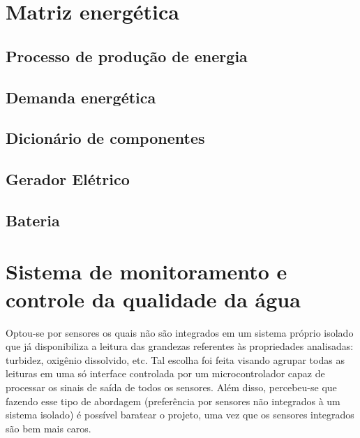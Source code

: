     
  \section{Matriz energética}
  	\subsection{Processo de produção de energia}
  		
  	\subsection{Demanda energética}
  		
  	\subsection{Dicionário de componentes}
  		
  	\subsection{Gerador Elétrico}
  		
  	\subsection{Bateria}
  		
    
  \section{Sistema de monitoramento e controle da qualidade da água}
    
    
      Optou-se por sensores os quais não são integrados em um sistema próprio isolado que já disponibiliza a leitura das grandezas
      referentes às propriedades analisadas: turbidez, oxigênio dissolvido, etc. Tal escolha foi feita visando agrupar todas as
      leituras em uma só interface controlada por um microcontrolador capaz de processar os sinais de saída de todos os sensores.
      Além disso, percebeu-se que fazendo esse tipo de abordagem (preferência por sensores não integrados à um sistema isolado)
      é possível baratear o projeto, uma vez que os sensores integrados são bem mais caros.
    
